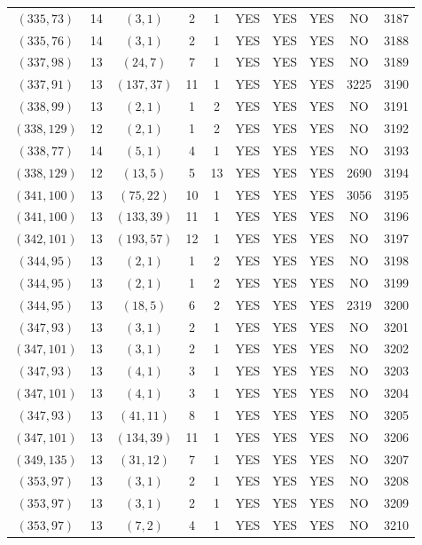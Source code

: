 \begin{longtable}{|c|c|c|c|c|c|c|c|c|c|}
$(335, 73)$ & 14 & $(3, 1)$ & 2 & 1 & YES & YES & YES & NO & 3187\\
$(335, 76)$ & 14 & $(3, 1)$ & 2 & 1 & YES & YES & YES & NO & 3188\\
$(337, 98)$ & 13 & $(24, 7)$ & 7 & 1 & YES & YES & YES & NO & 3189\\
$(337, 91)$ & 13 & $(137, 37)$ & 11 & 1 & YES & YES & YES & 3225 & 3190\\
$(338, 99)$ & 13 & $(2, 1)$ & 1 & 2 & YES & YES & YES & NO & 3191\\
$(338, 129)$ & 12 & $(2, 1)$ & 1 & 2 & YES & YES & YES & NO & 3192\\
$(338, 77)$ & 14 & $(5, 1)$ & 4 & 1 & YES & YES & YES & NO & 3193\\
$(338, 129)$ & 12 & $(13, 5)$ & 5 & 13 & YES & YES & YES & 2690 & 3194\\
$(341, 100)$ & 13 & $(75, 22)$ & 10 & 1 & YES & YES & YES & 3056 & 3195\\
$(341, 100)$ & 13 & $(133, 39)$ & 11 & 1 & YES & YES & YES & NO & 3196\\
$(342, 101)$ & 13 & $(193, 57)$ & 12 & 1 & YES & YES & YES & NO & 3197\\
$(344, 95)$ & 13 & $(2, 1)$ & 1 & 2 & YES & YES & YES & NO & 3198\\
$(344, 95)$ & 13 & $(2, 1)$ & 1 & 2 & YES & YES & YES & NO & 3199\\
$(344, 95)$ & 13 & $(18, 5)$ & 6 & 2 & YES & YES & YES & 2319 & 3200\\
$(347, 93)$ & 13 & $(3, 1)$ & 2 & 1 & YES & YES & YES & NO & 3201\\
$(347, 101)$ & 13 & $(3, 1)$ & 2 & 1 & YES & YES & YES & NO & 3202\\
$(347, 93)$ & 13 & $(4, 1)$ & 3 & 1 & YES & YES & YES & NO & 3203\\
$(347, 101)$ & 13 & $(4, 1)$ & 3 & 1 & YES & YES & YES & NO & 3204\\
$(347, 93)$ & 13 & $(41, 11)$ & 8 & 1 & YES & YES & YES & NO & 3205\\
$(347, 101)$ & 13 & $(134, 39)$ & 11 & 1 & YES & YES & YES & NO & 3206\\
$(349, 135)$ & 13 & $(31, 12)$ & 7 & 1 & YES & YES & YES & NO & 3207\\
$(353, 97)$ & 13 & $(3, 1)$ & 2 & 1 & YES & YES & YES & NO & 3208\\
$(353, 97)$ & 13 & $(3, 1)$ & 2 & 1 & YES & YES & YES & NO & 3209\\
$(353, 97)$ & 13 & $(7, 2)$ & 4 & 1 & YES & YES & YES & NO & 3210\\

\end{longtable}
